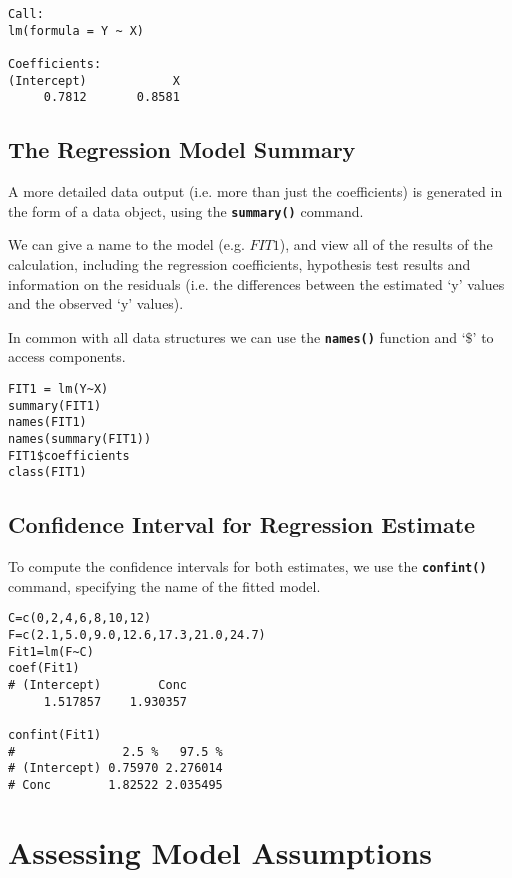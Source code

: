 \documentclass[a4paper,12pt]{article}
\begin{document}
\begin{verbatim}
Call:
lm(formula = Y ~ X)

Coefficients:
(Intercept)            X
     0.7812       0.8581
\end{verbatim}
\subsection{The Regression Model Summary}
A more detailed data output (i.e. more than just the coefficients) is generated in the form of a data object, using the \textbf{\texttt{summary()}} command.

We can give a name to the model (e.g. $FIT1$), and view all of the results of the calculation, including the regression coefficients, hypothesis test results and information on the residuals (i.e. the differences between the estimated ‘y’ values and the observed ‘y’ values).

In common with all data structures we can use the \textbf{\texttt{names()}} function and ‘$\$$’ to access components.

\begin{framed}
\begin{verbatim}
FIT1 = lm(Y~X)
summary(FIT1)
names(FIT1)
names(summary(FIT1))
FIT1$coefficients
class(FIT1)
\end{verbatim}
\end{framed}
\newpage
\subsection{Confidence Interval for Regression Estimate}
To compute the confidence intervals for both estimates, we use the \texttt\textbf{{confint()}} command, specifying the name of the fitted model.
\begin{framed}
\begin{verbatim}
C=c(0,2,4,6,8,10,12)
F=c(2.1,5.0,9.0,12.6,17.3,21.0,24.7)
Fit1=lm(F~C)
coef(Fit1)
# (Intercept)        Conc
     1.517857    1.930357

confint(Fit1)
#               2.5 %   97.5 %
# (Intercept) 0.75970 2.276014
# Conc        1.82522 2.035495
\end{verbatim}
\end{framed}

\newpage
\section{Assessing Model Assumptions}
\end{document}
